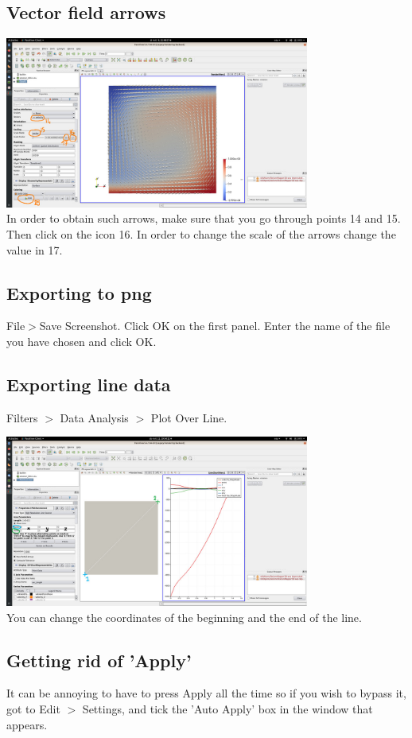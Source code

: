 \subsection*{Vector field arrows}

\begin{center}
\includegraphics[width=10cm]{images/paraview/p10}\\
{\captionfont In order to obtain such arrows, make sure that you go through points 14 and 15.\\ 
Then click on the icon 16. In order to change the scale of the arrows change the value in 17.}
\end{center}




\subsection*{Exporting to png}

File$>$Save Screenshot. Click OK on the first panel. Enter the name of the file you have chosen and click OK.   

\subsection*{Exporting line data}

Filters $>$ Data Analysis $>$ Plot Over Line.  

\begin{center}
\includegraphics[width=10cm]{images/paraview/p13}\\
{\captionfont You can change the coordinates of the beginning and the end of the line.} 
\end{center}

\subsection*{Getting rid of 'Apply'}

It can be annoying to have to press Apply all the time so if you wish to bypass it, got to Edit $>$ Settings, and 
tick the 'Auto Apply' box in the window that appears.





